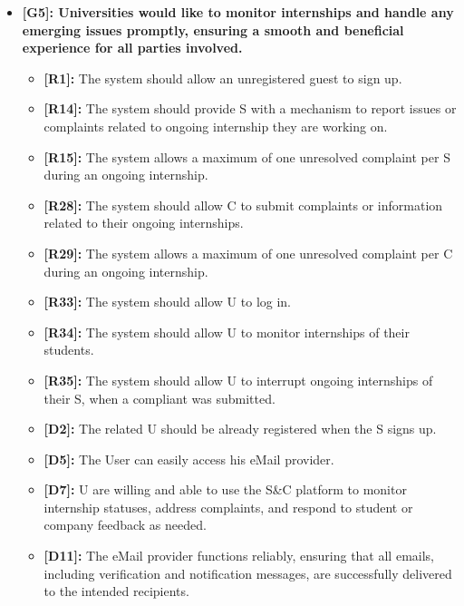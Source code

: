 \begin{itemize}
\item
  \textbf{[G5]: Universities would like to monitor internships and
  handle any emerging issues promptly, ensuring a smooth and beneficial
  experience for all parties involved.}

  \begin{itemize}
  \item
    \textbf{[R1]:} The system should allow an unregistered guest to sign up.
  \item
    \textbf{[R14]:} The system should provide S with a mechanism to report issues or complaints related to ongoing internship they are working on.
  \item
    \textbf{[R15]:} The system allows a maximum of one unresolved complaint per S during an ongoing internship.
  \item
    \textbf{[R28]:} The system should allow C to submit complaints or
    information related to their ongoing internships.
  \item
    \textbf{[R29]:} The system allows a maximum of one unresolved complaint per C during an ongoing internship.
  \item
    \textbf{[R33]:} The system should allow U to log in.
  \item
    \textbf{[R34]:} The system should allow U to monitor internships of their students.
  \item
    \textbf{[R35]:} The system should allow U to interrupt ongoing internships of their S, when a compliant was submitted.
  \item
    \textbf{[D2]:} The related U should be already registered when the S signs
    up.
  \item
    \textbf{[D5]:} The User can easily access his eMail provider.
  \item
    \textbf{[D7]:} U are willing and able to use the S\&C platform to monitor
    internship statuses, address complaints, and respond to student or
    company feedback as needed.
  \item
    \textbf{[D11]:} The eMail provider functions reliably, ensuring that all
    emails, including verification and notification messages, are
    successfully delivered to the intended recipients.
  \end{itemize}
\end{itemize}


\vspace{1.5cm}

